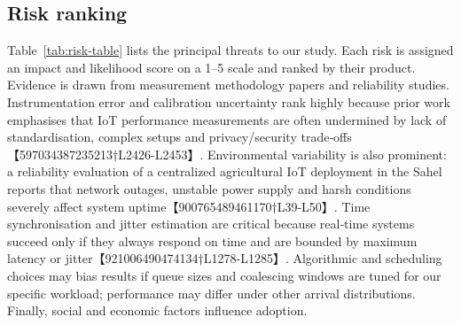 \subsection{Risk ranking}
Table~\ref{tab:risk-table} lists the principal threats to our study.  Each risk is assigned an impact and likelihood score on a 1--5 scale and ranked by their product.  Evidence is drawn from measurement methodology papers and reliability studies.  Instrumentation error and calibration uncertainty rank highly because prior work emphasises that IoT performance measurements are often undermined by lack of standardisation, complex setups and privacy/security trade‑offs【597034387235213†L2426-L2453】.  Environmental variability is also prominent: a reliability evaluation of a centralized agricultural IoT deployment in the Sahel reports that network outages, unstable power supply and harsh conditions severely affect system uptime【900765489461170†L39-L50】.  Time synchronisation and jitter estimation are critical because real‑time systems succeed only if they always respond on time and are bounded by maximum latency or jitter【921006490474134†L1278-L1285】.  Algorithmic and scheduling choices may bias results if queue sizes and coalescing windows are tuned for our specific workload; performance may differ under other arrival distributions.  Finally, social and economic factors influence adoption.

